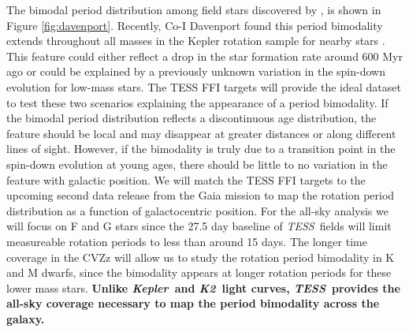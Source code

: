 \documentclass[letterpaper,12pt,preprint]{hack_aastex}
\newcommand{\Kepler}{{\it Kepler}}
\newcommand{\kepler}{\Kepler}
\newcommand{\Ktwo}{{\it K2}}
\newcommand{\ktwo}{\Ktwo}
\newcommand{\TESS}{{\it TESS}}
\begin{document}
The bimodal period distribution among field stars discovered by
\citet{mcquillan2013}, is shown in Figure \ref{fig:davenport}.
Recently, Co-I Davenport found this period bimodality extends throughout all
masses in the Kepler rotation sample for nearby stars \citep{davenport2017}.
This feature could either reflect a drop in the star formation rate around 600
Myr ago or could be explained by a previously unknown variation in the
spin-down evolution for low-mass stars.
The TESS FFI targets will provide the ideal dataset to test these two
scenarios explaining the appearance of a period bimodality.
If the bimodal period distribution reflects a discontinuous age distribution,
the feature should be local and may disappear at greater distances or along
different lines of sight.
However, if the bimodality is truly due to a transition point in the spin-down
evolution at young ages, there should be little to no variation in the feature
with galactic position.
We will match the TESS FFI targets to the upcoming second data
release from the Gaia mission \citep{perryman2001} to map the rotation period
distribution as a function of galactocentric position.
For the all-sky analysis we will focus on F and G stars since the 27.5 day
baseline of \TESS\ fields will limit measureable rotation periods to less than
around 15 days.
The longer time coverage in the CVZz will allow us to study the rotation
period bimodality in K and M dwarfs, since the bimodality appears at longer
rotation periods for these lower mass stars.
{\bf Unlike \kepler\ and \ktwo\ light curves, \TESS\ provides the all-sky
coverage necessary to map the period bimodality across the galaxy.}

\end{document}
